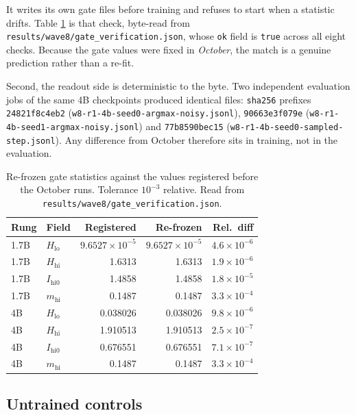 \documentclass[11pt,a4paper]{article}
\begin{document}
It writes its own gate files before training and refuses to start when a statistic drifts. Table
\ref{tab:s6b} is that check, byte-read from \texttt{results/wave8/gate\_verification.json}, whose
\texttt{ok} field is \texttt{true} across all eight checks. Because the gate values were fixed in
\emph{October}, the match is a genuine prediction rather than a re-fit.

Second, the readout side is deterministic to the byte. Two independent evaluation jobs of the same 4B
checkpoints produced identical files: \texttt{sha256} prefixes \texttt{24821f8c4eb2}
(\texttt{w8-r1-4b-seed0-argmax-noisy.jsonl}), \texttt{90663e3f079e}
(\texttt{w8-r1-4b-seed1-argmax-noisy.jsonl}) and \texttt{77b8590bec15}
(\texttt{w8-r1-4b-seed0-sampled-step.jsonl}). Any difference from October therefore sits in training,
not in the evaluation.

\begin{table}[h]
\centering
\small
\caption{Re-frozen gate statistics against the values registered before the October runs. Tolerance
$10^{-3}$ relative. Read from \texttt{results/wave8/\allowbreak gate\_verification.json}.}
\label{tab:s6b}
\begin{tabular}{@{}llrrr@{}}
\toprule
\textbf{Rung} & \textbf{Field} & \textbf{Registered} & \textbf{Re-frozen} & \textbf{Rel.\ diff} \\
\midrule
1.7B & $H_{\mathrm{lo}}$ & $9.6527\times10^{-5}$ & $9.6527\times10^{-5}$ & $4.6\times10^{-6}$ \\
1.7B & $H_{\mathrm{hi}}$ & 1.6313 & 1.6313 & $1.9\times10^{-6}$ \\
1.7B & $I_{\mathrm{hi0}}$ & 1.4858 & 1.4858 & $1.8\times10^{-5}$ \\
1.7B & $m_{\mathrm{hi}}$ & 0.1487 & 0.1487 & $3.3\times10^{-4}$ \\
4B & $H_{\mathrm{lo}}$ & 0.038026 & 0.038026 & $9.8\times10^{-6}$ \\
4B & $H_{\mathrm{hi}}$ & 1.910513 & 1.910513 & $2.5\times10^{-7}$ \\
4B & $I_{\mathrm{hi0}}$ & 0.676551 & 0.676551 & $7.1\times10^{-7}$ \\
4B & $m_{\mathrm{hi}}$ & 0.1487 & 0.1487 & $3.3\times10^{-4}$ \\
\bottomrule
\end{tabular}
\end{table}

\subsection*{Untrained controls}
\end{document}
